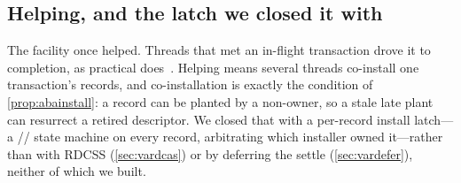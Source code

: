 \documentclass[11pt]{article}
\begin{document}


\subsection{Helping, and the latch we closed it with}
\label{sec:varhelping}

The facility once helped. Threads that met an in-flight transaction drove it to
completion, as practical \mcas does~\citep{harris2002mcas, barnes1993method}.
Helping means several threads co-install one transaction's records, and
co-installation is exactly the condition of \cref{prop:abainstall}: a record can
be planted by a non-owner, so a stale late plant can resurrect a retired
descriptor. We closed that with a per-record install latch---a
// state machine on every record, arbitrating
which installer owned it---rather than with RDCSS (\cref{sec:vardcas}) or by
deferring the settle (\cref{sec:vardefer}), neither of which we built.
\end{document}
